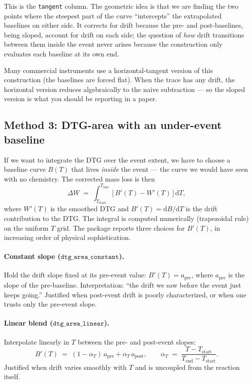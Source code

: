 \documentclass[11pt]{article}
\newcommand{\code}[1]{\texttt{#1}}
\begin{document}
This is the \code{tangent} column. The geometric idea is that we are
finding the two points where the steepest part of the curve
``intercepts'' the extrapolated baselines on either side. It corrects
for drift because the pre- and post-baselines, being sloped, account
for drift on each side; the question of \emph{how} drift transitions
between them inside the event never arises because the construction
only evaluates each baseline at its own end.

Many commercial instruments use a horizontal-tangent version of this
construction (the baselines are forced flat). When the trace has any
drift, the horizontal version reduces algebraically to the naive
subtraction --- so the sloped version is what you should be reporting
in a paper.

\subsection{Method 3: DTG-area with an under-event baseline}

If we want to integrate the DTG over the event extent, we have to
choose a baseline curve $B(T)$ that lives \emph{inside} the event ---
the curve we would have seen with no chemistry. The corrected mass
loss is then
\[
  \Delta W \;=\; \int_{T_{\mathrm{start}}}^{T_{\mathrm{end}}}
              \bigl[\,B'(T) - W'(T)\,\bigr]\,\mathrm{d}T,
\]
where $W'(T)$ is the smoothed DTG and $B'(T) = \mathrm{d}B/\mathrm{d}T$
is the drift contribution to the DTG. The integral is computed
numerically (trapezoidal rule) on the uniform $T$ grid. The package
reports three choices for $B'(T)$, in increasing order of physical
sophistication.

\paragraph{Constant slope ($\code{dtg\_area\_constant}$).}
Hold the drift slope fixed at its pre-event value:
$B'(T) = a_{\mathrm{pre}}$, where $a_{\mathrm{pre}}$ is the slope of
the pre-baseline. Interpretation: ``the drift we saw before the event
just keeps going.'' Justified when post-event drift is poorly
characterized, or when one trusts only the pre-event slope.

\paragraph{Linear blend ($\code{dtg\_area\_linear}$).}
Interpolate linearly in $T$ between the pre- and post-event slopes:
\[
  B'(T) \;=\; (1 - \alpha_T)\,a_{\mathrm{pre}} + \alpha_T\,a_{\mathrm{post}},
  \qquad
  \alpha_T \;=\; \frac{T - T_{\mathrm{start}}}{T_{\mathrm{end}} - T_{\mathrm{start}}}.
\]
Justified when drift varies smoothly with $T$ and is uncoupled from
the reaction itself.
\end{document}
